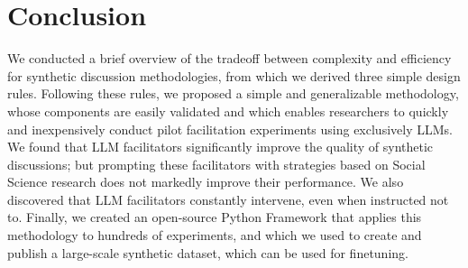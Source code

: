 %
\section{Conclusion}

We conducted a brief overview of the tradeoff between complexity and efficiency for synthetic discussion methodologies, from which we derived three simple design rules. Following these rules, we proposed a simple and generalizable methodology, whose components are easily validated and which enables researchers to quickly and inexpensively conduct pilot facilitation experiments using exclusively LLMs. We found that LLM facilitators significantly improve the quality of synthetic discussions; but prompting these facilitators with strategies based on Social Science research does not markedly improve their performance. We also discovered that LLM facilitators constantly intervene, even when instructed not to. Finally, we created an open-source Python Framework that applies this methodology to hundreds of experiments, and which we used to create and publish a large-scale synthetic dataset, which can be used for finetuning.